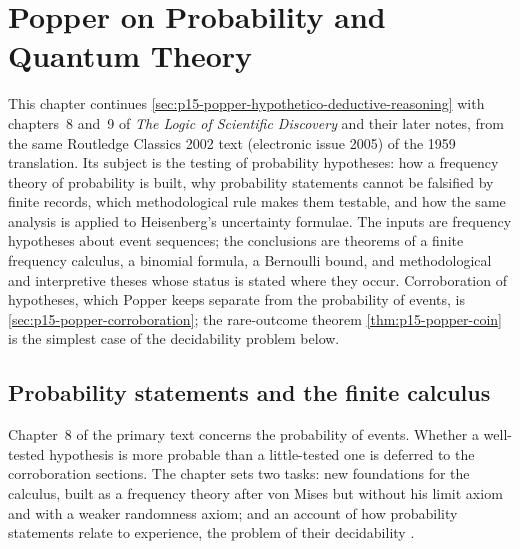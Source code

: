 \chapter{Popper on Probability and Quantum Theory}
\label{sec:p15-w02b-p15-027}

This chapter continues \cref{sec:p15-popper-hypothetico-deductive-reasoning}
with chapters~8 and~9 of \emph{The Logic of Scientific Discovery} and their
later notes, from the same Routledge Classics 2002 text (electronic issue
2005) of the 1959 translation. Its subject is the testing of probability
hypotheses: how a frequency theory of probability is built, why
probability statements cannot be falsified by finite records, which
methodological rule makes them testable, and how the same analysis is
applied to Heisenberg's uncertainty formulae. The inputs are frequency
hypotheses about event sequences; the conclusions are theorems of a
finite frequency calculus, a binomial formula, a Bernoulli bound, and
methodological and interpretive theses whose status is stated where they
occur. Corroboration of hypotheses, which Popper keeps separate from the
probability of events, is \cref{sec:p15-popper-corroboration}; the
rare-outcome theorem \cref{thm:p15-popper-coin} is the simplest case of
the decidability problem below.

\section{Probability statements and the finite calculus}
\label{sec:p15-w02b-p15-027-finite-frequency}

Chapter~8 of the primary text concerns the probability of events.
Whether a well-tested hypothesis is more probable than a little-tested
one is deferred to the corroboration sections. The chapter sets two
tasks: new foundations for the calculus, built as a frequency theory
after von Mises but without his limit axiom and with a weaker
randomness axiom; and an account of how probability statements relate
to experience, the problem of their decidability
\parencite[chapter~8, opening]{Popper2002LogicDiscoveryUI}.

